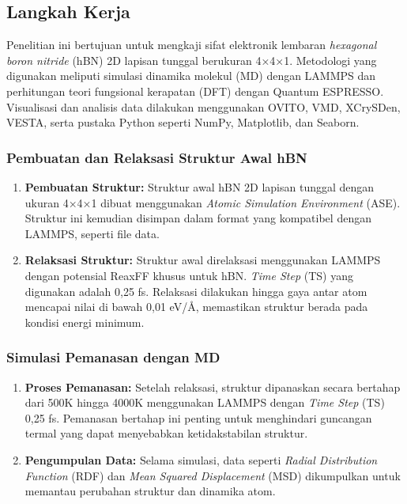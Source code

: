 \subsection{Langkah Kerja}
\label{sec:intro}
Penelitian ini bertujuan untuk mengkaji sifat elektronik lembaran \textit{hexagonal boron nitride} (hBN) 2D lapisan tunggal berukuran 4×4×1. Metodologi yang digunakan meliputi simulasi dinamika molekul (MD) dengan LAMMPS dan perhitungan teori fungsional kerapatan (DFT) dengan Quantum ESPRESSO. Visualisasi dan analisis data dilakukan menggunakan OVITO, VMD, XCrySDen, VESTA, serta pustaka Python seperti NumPy, Matplotlib, dan Seaborn. \subsubsection*{Pembuatan dan Relaksasi Struktur Awal hBN}
\label{sec:structure}
\begin{enumerate}
    \item \textbf{Pembuatan Struktur:} Struktur awal hBN 2D lapisan tunggal dengan ukuran 4×4×1 dibuat menggunakan \textit{Atomic Simulation Environment} (ASE). Struktur ini kemudian disimpan dalam format yang kompatibel dengan LAMMPS, seperti file data. \item \textbf{Relaksasi Struktur:} Struktur awal direlaksasi menggunakan LAMMPS dengan potensial ReaxFF khusus untuk hBN. \textit{Time Step} (TS) yang digunakan adalah 0,25 fs. Relaksasi dilakukan hingga gaya antar atom mencapai nilai di bawah 0,01 eV/Å, memastikan struktur berada pada kondisi energi minimum. \end{enumerate}

\subsubsection*{Simulasi Pemanasan dengan MD}
\label{sec:md_simulation}
\begin{enumerate}
    \item \textbf{Proses Pemanasan:} Setelah relaksasi, struktur dipanaskan secara bertahap dari 500K hingga 4000K menggunakan LAMMPS dengan \textit{Time Step} (TS) 0,25 fs. Pemanasan bertahap ini penting untuk menghindari guncangan termal yang dapat menyebabkan ketidakstabilan struktur. \item \textbf{Pengumpulan Data:} Selama simulasi, data seperti \textit{Radial Distribution Function} (RDF) dan \textit{Mean Squared Displacement} (MSD) dikumpulkan untuk memantau perubahan struktur dan dinamika atom. \end{enumerate}

